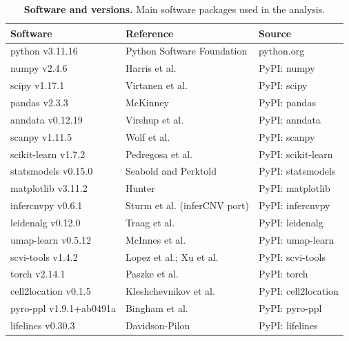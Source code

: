 \begin{table}[htbp]
\centering\small
\caption{\textbf{Software and versions.} Main software packages used in the analysis.}
\label{tab:keyresources}
\begin{tabular}{lll}
\toprule
Software & Reference & Source \\
\midrule
python v3.11.16 & Python Software Foundation & python.org \\
numpy v2.4.6 & Harris et al. & PyPI: numpy \\
scipy v1.17.1 & Virtanen et al. & PyPI: scipy \\
pandas v2.3.3 & McKinney & PyPI: pandas \\
anndata v0.12.19 & Virshup et al. & PyPI: anndata \\
scanpy v1.11.5 & Wolf et al. & PyPI: scanpy \\
scikit-learn v1.7.2 & Pedregosa et al. & PyPI: scikit-learn \\
statsmodels v0.15.0 & Seabold and Perktold & PyPI: statsmodels \\
matplotlib v3.11.2 & Hunter & PyPI: matplotlib \\
infercnvpy v0.6.1 & Sturm et al. (inferCNV port) & PyPI: infercnvpy \\
leidenalg v0.12.0 & Traag et al. & PyPI: leidenalg \\
umap-learn v0.5.12 & McInnes et al. & PyPI: umap-learn \\
scvi-tools v1.4.2 & Lopez et al.; Xu et al. & PyPI: scvi-tools \\
torch v2.14.1 & Paszke et al. & PyPI: torch \\
cell2location v0.1.5 & Kleshchevnikov et al. & PyPI: cell2location \\
pyro-ppl v1.9.1+ab0491a & Bingham et al. & PyPI: pyro-ppl \\
lifelines v0.30.3 & Davidson-Pilon & PyPI: lifelines \\
\bottomrule
\end{tabular}
\end{table}
